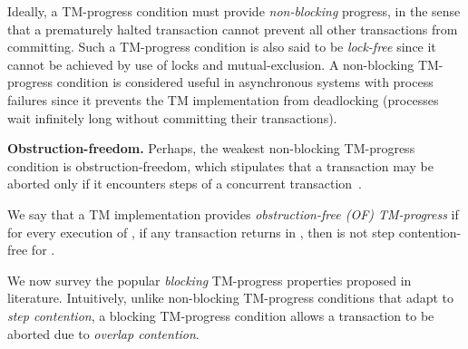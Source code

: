 Ideally, a TM-progress condition must provide \emph{non-blocking} progress, in the sense that a prematurely halted
transaction cannot prevent all other transactions from committing.
Such a TM-progress condition is also said to be \emph{lock-free}
since it cannot be achieved by use of locks and mutual-exclusion.
A non-blocking TM-progress condition is considered useful in asynchronous systems with process failures
since it prevents the TM implementation from deadlocking (processes wait infinitely long without
committing their transactions).

\vspace{1mm}\noindent\textbf{Obstruction-freedom.}
Perhaps, the weakest non-blocking TM-progress condition is obstruction-freedom, which stipulates
that a transaction may be aborted only if it encounters steps of a concurrent transaction~\cite{HS11-progress}.
\begin{definition}
We say that a TM implementation  provides \emph{obstruction-free (OF) TM-progress} if for every execution  of , 
if any transaction  returns  in , then  is not step contention-free for . 
\end{definition}
We now survey the popular \emph{blocking} TM-progress properties proposed in literature. Intuitively,
unlike non-blocking TM-progress conditions that adapt to \emph{step contention}, 
a blocking TM-progress condition allows a transaction to be aborted due to \emph{overlap contention}.

